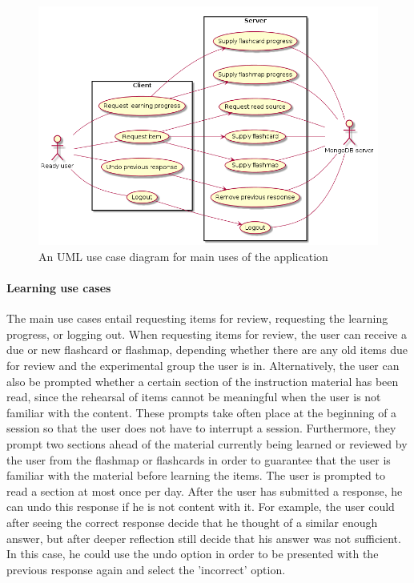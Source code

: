 \begin{figure}[h!]
\centering
\includegraphics[width=\textwidth]{img/mainusecase.png}
\caption{An UML use case diagram for main uses of the application}
\label{fig:mainusecase}
\end{figure}

\paragraph{Learning use cases} The main use cases entail requesting items for review, requesting the learning progress, or logging out. When requesting items for review, the user can receive a due or new flashcard or flashmap, depending whether there are any old items due for review and the experimental group the user is in. Alternatively, the user can also be prompted whether a certain section of the instruction material has been read, since the rehearsal of items cannot be meaningful when the user is not familiar with the content. These prompts take often place at the beginning of a session so that the user does not have to interrupt a session. Furthermore, they prompt two sections ahead of the material currently being learned or reviewed by the user from the flashmap or flashcards in order to guarantee that the user is familiar with the material before learning the items. The user is prompted to read a section at most once per day. After the user has submitted a response, he can undo this response if he is not content with it. For example, the user could after seeing the correct response decide that he thought of a similar enough answer, but after deeper reflection still decide that his answer was not sufficient. In this case, he could use the undo option in order to be presented with the previous response again and select the 'incorrect' option.

